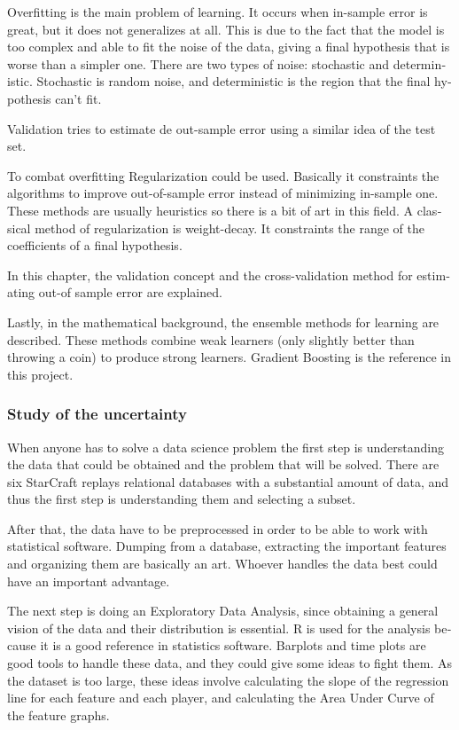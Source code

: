 \begin{otherlanguage}{british}
Overfitting is the main problem of learning. It occurs when in-sample error is
great, but it does not generalizes at all. This is due to the fact that the
model is too complex and able to fit the noise of the data, giving a final
hypothesis that is worse than a simpler one. There are two types of noise:
stochastic and deterministic. Stochastic is random noise, and deterministic
is the region that the final hypothesis can't fit.

Validation tries to estimate de out-sample error using a similar idea of the
test set.

To combat overfitting Regularization could be used. Basically it constraints
the algorithms to improve out-of-sample error instead of minimizing in-sample
one. These methods are usually heuristics so there is a bit of art in this
field. A classical method of regularization is weight-decay. It constraints
the range of the coefficients of a final hypothesis.

In this chapter, the validation concept and the cross-validation method for
estimating out-of sample error are explained.


Lastly, in the mathematical background, the ensemble methods for learning are
described. These methods combine weak learners (only slightly better than
throwing a coin) to produce strong learners. Gradient Boosting is the reference
in this project.

\subsubsection*{Study of the uncertainty}

When anyone has to solve a data science problem the first step is understanding
the data that could be obtained and the problem that will be solved. There are
six StarCraft replays relational databases with a substantial amount of data,
and thus the first step is understanding them and selecting a subset.

After that, the data have to be preprocessed in order to be able to work with
statistical software. Dumping from a database, extracting the important features
and organizing them are basically an art. Whoever handles the data best could
have an important advantage.

The next step is doing an Exploratory Data Analysis, since obtaining a general
vision of the data and their distribution is essential. R is used for the
analysis because it is a good reference in statistics software. Barplots and
time plots are good tools to handle these data, and they could give some ideas to
fight them. As the dataset is too large, these ideas involve calculating the
slope of the regression line for each feature and each player, and calculating
the Area Under Curve of the feature graphs.


\end{otherlanguage}
